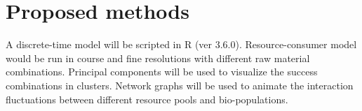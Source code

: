 \documentclass[a4paper, 11pt]{article}
\begin{document}
\section{Proposed methods}
A discrete-time model will be scripted in R (ver 3.6.0).  Resource-consumer model would be run in course and fine resolutions with different raw material combinations.
Principal components will be used to visualize the success combinations in clusters.  Network graphs will be used to animate the interaction fluctuations between different resource pools and bio-populations.
\end{document}
